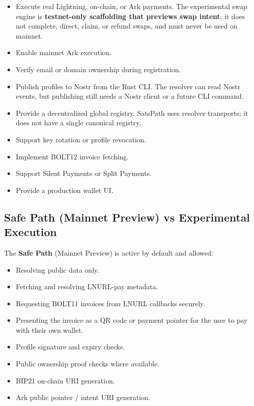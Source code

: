 \documentclass[
]{article}
\providecommand{\tightlist}{%
  \setlength{\itemsep}{0pt}\setlength{\parskip}{0pt}}
\begin{document}
\begin{itemize}
\tightlist
\item
  Execute real Lightning, on-chain, or Ark payments. The experimental
  swap engine is \textbf{testnet-only scaffolding that previews swap
  intent}; it does not complete, direct, claim, or refund swaps, and
  must never be used on mainnet.
\item
  Enable mainnet Ark execution.
\item
  Verify email or domain ownership during registration.
\item
  Publish profiles to Nostr from the Rust CLI. The resolver can read
  Nostr events, but publishing still needs a Nostr client or a future
  CLI command.
\item
  Provide a decentralized global registry. SatsPath uses resolver
  transports; it does not have a single canonical registry.
\item
  Support key rotation or profile revocation.
\item
  Implement BOLT12 invoice fetching.
\item
  Support Silent Payments or Split Payments.
\item
  Provide a production wallet UI.
\end{itemize}

\hypertarget{safe-path-mainnet-preview-vs-experimental-execution}{%
\subsection{Safe Path (Mainnet Preview) vs Experimental
Execution}\label{safe-path-mainnet-preview-vs-experimental-execution}}

The \textbf{Safe Path} (Mainnet Preview) is active by default and
allowed:

\begin{itemize}
\tightlist
\item
  Resolving public data only.
\item
  Fetching and resolving LNURL-pay metadata.
\item
  Requesting BOLT11 invoices from LNURL callbacks securely.
\item
  Presenting the invoice as a QR code or payment pointer for the user to
  pay with their own wallet.
\item
  Profile signature and expiry checks.
\item
  Public ownership proof checks where available.
\item
  BIP21 on-chain URI generation.
\item
  Ark public pointer / intent URI generation.
\end{itemize}
\end{document}
